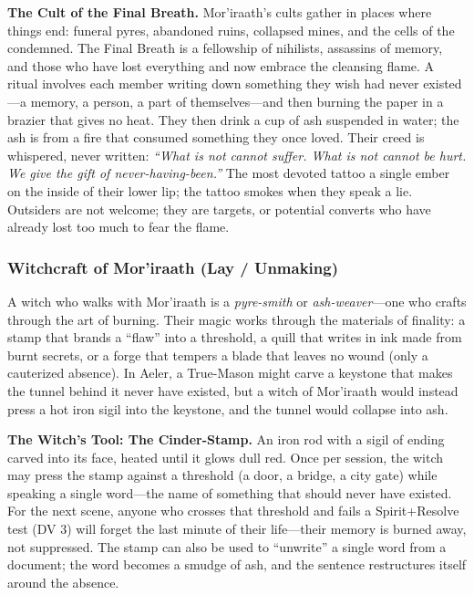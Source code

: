 \textbf{The Cult of the Final Breath.} Mor'iraath's cults gather in places where things end: funeral pyres, abandoned ruins, collapsed mines, and the cells of the condemned. The Final Breath is a fellowship of nihilists, assassins of memory, and those who have lost everything and now embrace the cleansing flame. A ritual involves each member writing down something they wish had never existed---a memory, a person, a part of themselves---and then burning the paper in a brazier that gives no heat. They then drink a cup of ash suspended in water; the ash is from a fire that consumed something they once loved. Their creed is whispered, never written: \textit{``What is not cannot suffer. What is not cannot be hurt. We give the gift of never-having-been.''} The most devoted tattoo a single ember on the inside of their lower lip; the tattoo smokes when they speak a lie. Outsiders are not welcome; they are targets, or potential converts who have already lost too much to fear the flame.

\subsubsection*{Witchcraft of Mor'iraath (Lay / Unmaking)}

A witch who walks with Mor'iraath is a \textit{pyre-smith} or \textit{ash-weaver}---one who crafts through the art of burning. Their magic works through the materials of finality: a stamp that brands a ``flaw'' into a threshold, a quill that writes in ink made from burnt secrets, or a forge that tempers a blade that leaves no wound (only a cauterized absence). In Aeler, a True-Mason might carve a keystone that makes the tunnel behind it never have existed, but a witch of Mor'iraath would instead press a hot iron sigil into the keystone, and the tunnel would collapse into ash.

\textbf{The Witch's Tool: The Cinder-Stamp.} An iron rod with a sigil of ending carved into its face, heated until it glows dull red. Once per session, the witch may press the stamp against a threshold (a door, a bridge, a city gate) while speaking a single word---the name of something that should never have existed. For the next scene, anyone who crosses that threshold and fails a Spirit+Resolve test (DV 3) will forget the last minute of their life---their memory is burned away, not suppressed. The stamp can also be used to ``unwrite'' a single word from a document; the word becomes a smudge of ash, and the sentence restructures itself around the absence.

